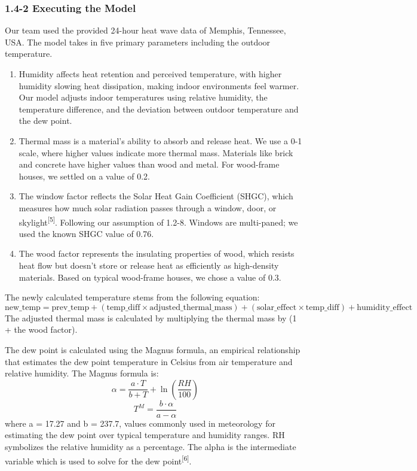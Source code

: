 \documentclass{article}
\begin{document}
\subsubsection*{1.4-2 Executing the Model}

Our team used the provided 24-hour heat wave data of Memphis, Tennessee, USA. The model takes in five primary parameters including the outdoor temperature.

\begin{enumerate}
    \item Humidity affects heat retention and perceived temperature, with higher humidity slowing heat dissipation, making indoor environments feel warmer. Our model adjusts indoor temperatures using relative humidity, the temperature difference, and the deviation between outdoor temperature and the dew point. 
    \item Thermal mass is a material’s ability to absorb and release heat. We use a 0-1 scale, where higher values indicate more thermal mass. Materials like brick and concrete have higher values than wood and metal. For wood-frame houses, we settled on a value of 0.2. 
    \item The window factor reflects the Solar Heat Gain Coefficient (SHGC), which measures how much solar radiation passes through a window, door, or skylight\textsuperscript{[5]}. Following our assumption of 1.2-8. Windows are multi-paned; we used the known SHGC value of 0.76. 
    \item The wood factor represents the insulating properties of wood, which resists heat flow but doesn't store or release heat as efficiently as high-density materials. Based on typical wood-frame houses, we chose a value of 0.3.
\end{enumerate}

The newly calculated temperature stems from the following equation:
\begin{equation}
    \text{new\_temp} = \text{prev\_temp} + (\text{temp\_diff} \times \text{adjusted\_thermal\_mass}) + (\text{solar\_effect} \times \text{temp\_diff}) + \text{humidity\_effect} 
    \label{eq:temperature_model}
\end{equation}
The adjusted thermal mass is calculated by multiplying the thermal mass by (1 + the wood factor).

The dew point is calculated using the Magnus formula, an empirical relationship that estimates the dew point temperature in Celsius from air temperature and relative humidity. The Magnus formula is:
\begin{equation}
    \alpha = \frac{a \cdot T}{b + T} + \ln\left(\frac{RH}{100}\right)
    \label{eq:alpha_equation}
\end{equation}
\begin{equation}
    T^M = \frac{b \cdot \alpha}{a - \alpha}
    \label{eq:custom_equation}
\end{equation}
where a = 17.27 and b = 237.7, values commonly used in meteorology for estimating the dew point over typical temperature and humidity ranges. RH symbolizes the relative humidity as a percentage. The alpha is the intermediate variable which is used to solve for the dew point\textsuperscript{[6]}.
\end{document}
